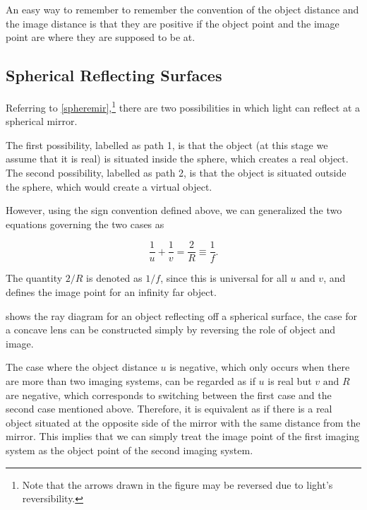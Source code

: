 \documentclass[english,a4paper,12pt]{report}
\begin{document}
An easy way to remember to remember the convention of the object distance and the image distance is that they are positive if the object point and the image point are where they are supposed to be at.

\subsection{Spherical Reflecting Surfaces} \label{spheremirsec} 

Referring to \cref{spheremir},\footnote{Note that the arrows drawn in the figure may be reversed due to light's reversibility.} there are two possibilities in which light can reflect at a spherical mirror.


The first possibility, labelled as path 1, is that the object (at this stage we assume that it is real) is situated inside the sphere, which creates a real object. The second possibility, labelled as path 2, is that the object is situated outside the sphere, which would create a virtual object.

However, using the sign convention defined above, we can generalized the two equations governing the two cases as 

\begin{equation}
    \frac{1}{u} + \frac{1}{v} = \frac{2}{R} \equiv \frac{1}{f}.
\end{equation}

The quantity \(2/R\) is denoted as \(1/f\), since this is universal for all \(u \text { and } v\), and defines the image point for an infinity far object.   

 shows the ray diagram for an object reflecting off a spherical surface, the case for a concave lens can be constructed simply by reversing the role of object and image.


The case where the object distance \(u\) is negative, which only occurs when there are more than two imaging systems, can be regarded as if \(u\) is real but \(v \text { and } R\) are negative, which corresponds to switching between the first case and the second case mentioned above. Therefore, it is equivalent as if there is a real object situated at the opposite side of the mirror with the same distance from the mirror. This implies that we can simply treat the image point of the first imaging system as the object point of the second imaging system.
\end{document}
